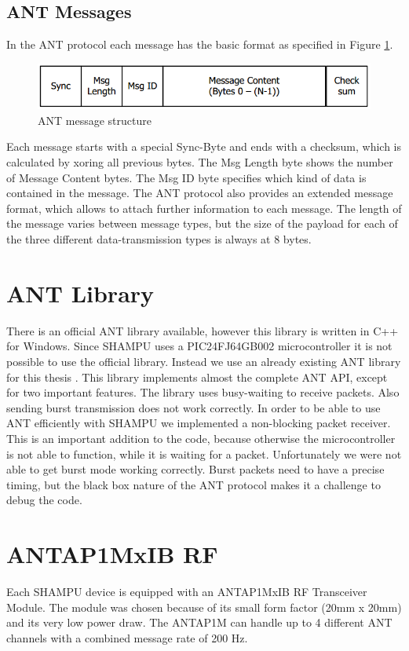 \subsection{ANT Messages}
In the ANT protocol each message has the basic format as specified in Figure \ref{fig:antmsg}.
\begin{figure}[H]
	\centering
	\includegraphics[scale=.75]{content/images/ANTmsg.png}
	\caption{ANT message structure\cite{DynastreamInnovationsInc.2013}}\label{fig:antmsg}
\end{figure}
Each message starts with a special Sync-Byte and ends with a checksum, which is calculated by xoring all previous bytes. The Msg Length byte shows the number of Message Content bytes. The Msg ID byte specifies which kind of data is contained in the message. The ANT protocol also provides an extended message format, which allows to attach further information to each message. The length of the message varies between message types, but the size of the payload for each of the three different data-transmission types is always at 8 bytes.

\section{ANT Library}
There is an official ANT library \cite{ANTWinLib} available, however this library is written in C++ for Windows. Since SHAMPU uses a PIC24FJ64GB002 microcontroller\cite{smeets2014demonstration} it is not possible to use the official library. Instead we use an already existing ANT library for this thesis \cite{ANTPICLIB}. This library implements almost the complete ANT API, except for two important features. The library uses busy-waiting to receive packets. Also sending burst transmission does not work correctly. In order to be able to use ANT efficiently with SHAMPU we implemented a non-blocking packet receiver. This is an important addition to the code, because otherwise the microcontroller is not able to function, while it is waiting for a packet. Unfortunately we were not able to get burst mode working correctly. Burst packets need to have a precise timing, but the black box nature of the ANT protocol makes it a challenge to debug the code.
\section{ANTAP1MxIB RF}
Each SHAMPU device is equipped with an ANTAP1MxIB RF Transceiver Module\cite{Networks}. The module was chosen because of its small form factor (20mm x 20mm) and its very low power draw. The ANTAP1M can handle up to 4 different ANT channels with a combined message rate of 200 Hz. 

